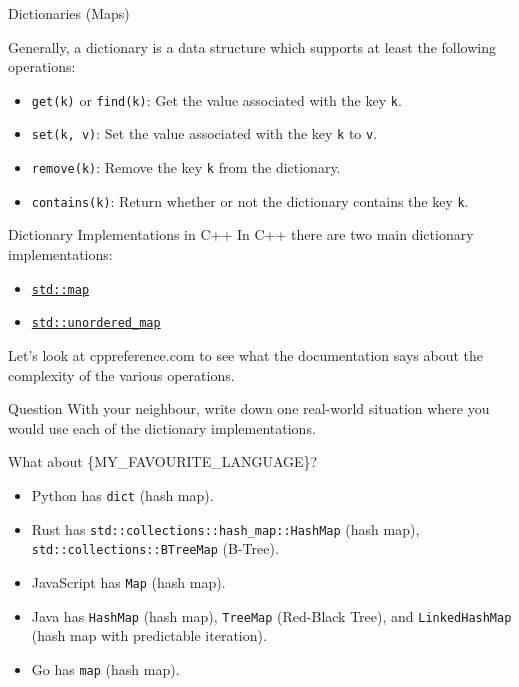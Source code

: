 \documentclass{algo}
\begin{document}
\begin{frame}{Dictionaries (Maps)}

    Generally, a dictionary is a data structure which supports at least the
    following operations:

    \begin{itemize}
        \item \texttt{get(k)} or \texttt{find(k)}: Get the value associated with
            the key \texttt{k}.
        \item \texttt{set(k, v)}: Set the value associated with the key
            \texttt{k} to \texttt{v}.
        \item \texttt{remove(k)}: Remove the key \texttt{k} from the dictionary.
        \item \texttt{contains(k)}: Return whether or not the dictionary
            contains the key \texttt{k}.
    \end{itemize}

\end{frame}

\begin{frame}{Dictionary Implementations in C++}
    In C++ there are two main dictionary implementations:

    \begin{itemize}
        \item \href{https://en.cppreference.com/w/cpp/container/map}{\texttt{std::map}}
        \item \href{https://en.cppreference.com/w/cpp/container/unordered_map}{\texttt{std::unordered\_map}}
    \end{itemize}

    Let's look at cppreference.com to see what the documentation says about the
    complexity of the various operations.

    \pause

    \begin{block}{Question}
        With your neighbour, write down one real-world situation where you would
        use each of the dictionary implementations.
    \end{block}
\end{frame}

\begin{frame}{What about \{MY\_FAVOURITE\_LANGUAGE\}?}
    \begin{itemize}
        \item Python has \texttt{dict} (hash map).
        \item Rust has \texttt{std::collections::hash\_map::HashMap} (hash map),
            \texttt{std::collections::BTreeMap} (B-Tree).
        \item JavaScript has \texttt{Map} (hash map).
        \item Java has \texttt{HashMap} (hash map),
            \texttt{TreeMap} (Red-Black Tree), and
            \texttt{LinkedHashMap} (hash map with predictable iteration).
        \item Go has \texttt{map} (hash map).
    \end{itemize}
\end{frame}
\end{document}
